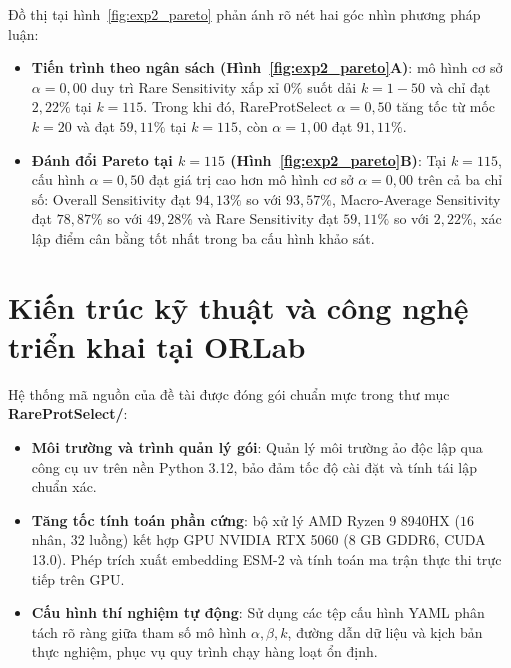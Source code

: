 Đồ thị tại hình~\ref{fig:exp2_pareto} phản ánh rõ nét hai góc nhìn phương pháp luận:
\begin{itemize}[noitemsep,topsep=1pt]
    \item \textbf{Tiến trình theo ngân sách (Hình~\ref{fig:exp2_pareto}A)}: mô hình cơ sở $\alpha = 0{,}00$ duy trì Rare Sensitivity xấp xỉ $0\%$ suốt dải $k = 1 - 50$ và chỉ đạt $2{,}22\%$ tại $k = 115$. Trong khi đó, RareProtSelect $\alpha = 0{,}50$ tăng tốc từ mốc $k = 20$ và đạt $59{,}11\%$ tại $k = 115$, còn $\alpha = 1{,}00$ đạt $91{,}11\%$.
    \item \textbf{Đánh đổi Pareto tại $k = 115$ (Hình~\ref{fig:exp2_pareto}B)}: Tại $k = 115$, cấu hình $\alpha = 0{,}50$ đạt giá trị cao hơn mô hình cơ sở $\alpha = 0{,}00$ trên cả ba chỉ số: Overall Sensitivity đạt $94{,}13\%$ so với $93{,}57\%$, Macro-Average Sensitivity đạt $78{,}87\%$ so với $49{,}28\%$ và Rare Sensitivity đạt $59{,}11\%$ so với $2{,}22\%$, xác lập điểm cân bằng tốt nhất trong ba cấu hình khảo sát.
\end{itemize}

\section{Kiến trúc kỹ thuật và công nghệ triển khai tại ORLab}
\label{sec:kien_truc_cong_nghe}

Hệ thống mã nguồn của đề tài được đóng gói chuẩn mực trong thư mục \textbf{RareProtSelect/}:
\begin{itemize}[noitemsep,topsep=0pt,partopsep=0pt]
    \item \textbf{Môi trường và trình quản lý gói}: Quản lý môi trường ảo độc lập qua công cụ uv trên nền Python 3.12, bảo đảm tốc độ cài đặt và tính tái lập chuẩn xác.
    \item \textbf{Tăng tốc tính toán phần cứng}: bộ xử lý AMD Ryzen 9 8940HX ($16$ nhân, $32$ luồng) kết hợp GPU NVIDIA RTX 5060 ($8\text{ GB}$ GDDR6, CUDA 13.0). Phép trích xuất embedding ESM-2 và tính toán ma trận thực thi trực tiếp trên GPU.
    \item \textbf{Cấu hình thí nghiệm tự động}: Sử dụng các tệp cấu hình YAML phân tách rõ ràng giữa tham số mô hình $\alpha, \beta, k$, đường dẫn dữ liệu và kịch bản thực nghiệm, phục vụ quy trình chạy hàng loạt ổn định.
\end{itemize}
